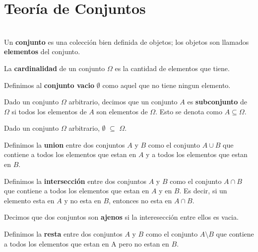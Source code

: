\chapter{Teoría de Conjuntos}

\begin{dfn}
\label{conjunto} \cite{Schaums} \\
Un \textbf{conjunto} es una colección bien definida de objetos; los objetos son llamados \textbf{elementos} del conjunto.
\end{dfn}

\begin{dfn}
La \textbf{cardinalidad} de un conjunto $\Omega$ es la cantidad de elementos que tiene.
\end{dfn}

\begin{dfn}
Definimos al \textbf{conjunto vacio} $\emptyset$ como aquel que no tiene ningun elemento.
\end{dfn}

\begin{dfn}
Dado un conjunto $\Omega$ arbitrario, decimos que un conjunto $A$ es \textbf{subconjunto} de $\Omega$  si todos los elementos de $A$ son elementos de $\Omega$. Esto se denota como $A 	\subseteq \Omega$.
\end{dfn}

\begin{obs}
Dado un conjunto $\Omega$ arbitrario, $\emptyset$ 	$\subseteq$ $\Omega$. 
\end{obs}

\begin{dfn}
Definimos la \textbf{union} entre dos conjuntos $A$ y $B$ como el conjunto $A \cup B$ que contiene a todos los elementos que estan en $A$ y a todos los elementos que estan en $B$.
\end{dfn}

\begin{dfn}
Definimos la \textbf{intersección} entre dos conjuntos $A$ y $B$ como el conjunto $A \cap B$ que contiene a todos los elementos que estan en $A$ y  en $B$. Es decir, si un elemento esta en $A$ y no esta en $B$, entonces no esta en $A \cap B$.
\end{dfn}

\begin{dfn}
Decimos que dos conjuntos son \textbf{ajenos} si la interesección entre ellos es vacia. 
\end{dfn}

\begin{dfn}
Definimos la \textbf{resta} entre dos conjuntos $A$ y $B$ como el conjunto $A \setminus B$ que contiene a todos los elementos que estan en A pero no estan en $B$.
\end{dfn}

